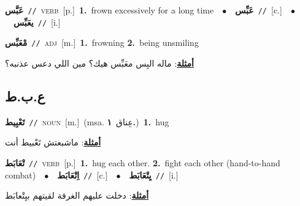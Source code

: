 \documentclass[10pt,a4paper,twoside]{article} %
\begin{document}
\begin{multicols}{2}
{\setlength\topsep{0pt}\textbf{\foreignlanguage{arabic}{عَبَّس}}\ {\color{gray}\texttt{//}\color{black}}\ \textsc{verb}\ [p.]\ \textbf{1.}~frown excessively for a long time\ \ $\bullet$\ \ \setlength\topsep{0pt}\textbf{\foreignlanguage{arabic}{عَبِّس}}\ {\color{gray}\texttt{//}\color{black}}\ [c.]\ \ $\bullet$\ \ \setlength\topsep{0pt}\textbf{\foreignlanguage{arabic}{يعَبِّس}}\ {\color{gray}\texttt{//}\color{black}}\ [i.]\ } \vspace{2mm}

{\setlength\topsep{0pt}\textbf{\foreignlanguage{arabic}{مْعَبِّس}}\ {\color{gray}\texttt{//}\color{black}}\ \textsc{adj}\ [m.]\ \textbf{1.}~frowning  \textbf{2.}~being unsmiling\  \begin{flushright}\color{gray}\foreignlanguage{arabic}{\textbf{\underline{\foreignlanguage{arabic}{أمثلة}}}: ماله البِس معَبِّس هيك؟ مين اللي دعس عذنبه؟}\end{flushright}\color{black}} \vspace{2mm}

\vspace{-3mm}
\subsection*{\color{blue}\foreignlanguage{arabic}{ع.ب.ط}\color{blue}{}} 

{\setlength\topsep{0pt}\textbf{\foreignlanguage{arabic}{تَعْبِيط}}\ {\color{gray}\texttt{//}\color{black}}\ \textsc{noun}\ [m.]\ \color{gray}(msa. \foreignlanguage{arabic}{عِناق}~\foreignlanguage{arabic}{\textbf{١.}})\color{black}\ \textbf{1.}~hug\  \begin{flushright}\color{gray}\foreignlanguage{arabic}{\textbf{\underline{\foreignlanguage{arabic}{أمثلة}}}: ماشبعتش تَعْبيط أنت}\end{flushright}\color{black}} \vspace{2mm}

{\setlength\topsep{0pt}\textbf{\foreignlanguage{arabic}{تْعَابَط}}\ {\color{gray}\texttt{//}\color{black}}\ \textsc{verb}\ [p.]\ \textbf{1.}~hug each other.  \textbf{2.}~fight each other (hand-to-hand combat)\ \ $\bullet$\ \ \setlength\topsep{0pt}\textbf{\foreignlanguage{arabic}{اِتْعَابَط}}\ {\color{gray}\texttt{//}\color{black}}\ [c.]\ \ $\bullet$\ \ \setlength\topsep{0pt}\textbf{\foreignlanguage{arabic}{يِتْعَابَط}}\ {\color{gray}\texttt{//}\color{black}}\ [i.]\  \begin{flushright}\color{gray}\foreignlanguage{arabic}{\textbf{\underline{\foreignlanguage{arabic}{أمثلة}}}: دخلت عليهم الغرفة لقيتهم بيِتْعابَط}\end{flushright}\color{black}} \vspace{2mm}


\end{multicols}
\end{document}

